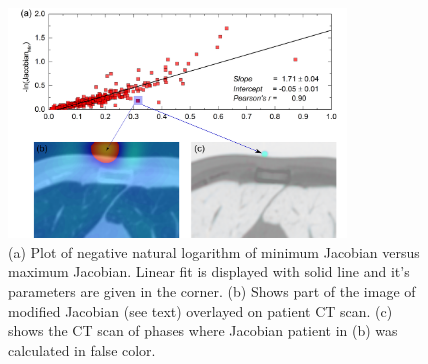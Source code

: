 \documentclass[type=dr, dr=rernat, accentcolor=tud7b,colorbacktitle, bigchapter, openright, twoside, 12pt ]{tudthesis}
\begin{document}
\begin{figure}[H]
	\begin{center}		
		\includegraphics[width=0.8\textwidth]{./Images/jacSum_lung.png}
		\caption{(a) Plot of negative natural logarithm of minimum Jacobian versus maximum Jacobian. Linear fit is displayed with solid line and it's parameters are given in the corner. (b) Shows part of the image of modified Jacobian (see text) overlayed on patient CT scan. (c) shows the CT scan of phases where Jacobian patient in (b) was calculated in false color.}
		\label{calcJac_lung}
	\end{center}
\end{figure}

\newpage
\end{document}
